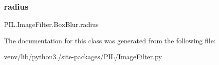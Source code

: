 \mbox{\label{classPIL_1_1ImageFilter_1_1BoxBlur_a26a090753606f60baa94f7c9e36b4a2d}} 
\subsubsection{\texorpdfstring{radius}{radius}}
{\footnotesize\ttfamily P\+I\+L.\+Image\+Filter.\+Box\+Blur.\+radius}



The documentation for this class was generated from the following file\+:\begin{DoxyCompactItemize}
\item 
venv/lib/python3./site-\/packages/\+P\+I\+L/\hyperlink{ImageFilter_8py}{Image\+Filter.\+py}\end{DoxyCompactItemize}
